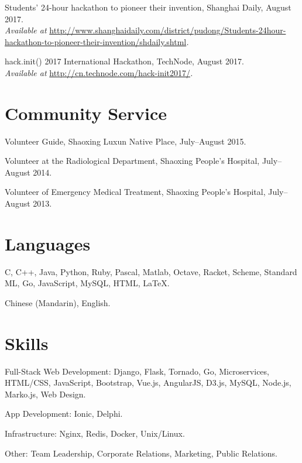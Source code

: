 \documentclass[letterpaper]{article}
\renewenvironment{itemize}{
  \begin{list}{}{
    \setlength{\leftmargin}{1.5em}
  }
}{
  \end{list}
}
\begin{document}
\begin{itemize}
  \item Students' 24-hour hackathon to pioneer their invention, Shanghai Daily, August 2017. \\
  \emph{Available at }\url{http://www.shanghaidaily.com/district/pudong/Students-24hour-hackathon-to-pioneer-their-invention/shdaily.shtml}\emph{.}

  \item hack.init() 2017 International Hackathon, TechNode, August 2017. \\
  \emph{Available at }\url{http://cn.technode.com/hack-init2017/}\emph{.}
\end{itemize}


\section*{Community Service}

\begin{itemize}
  \item Volunteer Guide, Shaoxing Luxun Native Place, July--August 2015.

  \item Volunteer at the Radiological Department, Shaoxing People's Hospital, July--August 2014.

  \item Volunteer of Emergency Medical Treatment, Shaoxing People's Hospital, July--August 2013.

\end{itemize}


\section*{Languages}

\begin{itemize}
  \item C, C++, Java, Python, Ruby, Pascal, Matlab, Octave, Racket, Scheme, Standard ML, Go, JavaScript, MySQL, HTML, \LaTeX.
  \item Chinese (Mandarin), English.
\end{itemize}


\section*{Skills}

\begin{itemize}
  \item Full-Stack Web Development: Django, Flask, Tornado, Go, Microservices, HTML/CSS, JavaScript, Bootstrap, Vue.js, AngularJS, D3.js, MySQL, Node.js, Marko.js, Web Design.

  \item App Development: Ionic, Delphi.

  \item Infrastructure: Nginx, Redis, Docker, Unix/Linux.

  \item Other: Team Leadership, Corporate Relations, Marketing, Public Relations.
\end{itemize}
\end{document}
